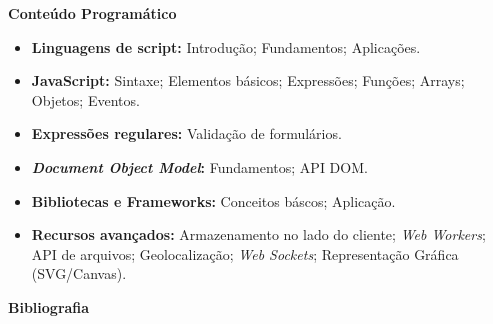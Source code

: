 
\begin{snugshade}\begin{center}\textbf{
    Conteúdo Programático
}\end{center}\end{snugshade}

\begin{itemize}

\item \textbf{Linguagens de script:}
    Introdução; Fundamentos; Aplicações.

\item \textbf{JavaScript:}
    Sintaxe; Elementos básicos; Expressões; Funções; Arrays; Objetos; Eventos.

\item \textbf{Expressões regulares:}
    Validação de formulários.

\item \textbf{\textit{Document Object Model}:}
    Fundamentos; API DOM.

\item \textbf{Bibliotecas e Frameworks:}
    Conceitos báscos; Aplicação.

\item \textbf{Recursos avançados:}
    Armazenamento no lado do cliente; \textit{Web Workers}; API de arquivos; Geolocalização; \textit{Web Sockets}; Representação Gráfica (SVG/Canvas).

\end{itemize}







\begin{snugshade}\begin{center}\textbf{
    Bibliografia
}\end{center}\end{snugshade}

